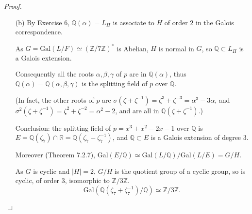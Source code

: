 \documentclass[11pt,a4paper]{article}
\newcommand{\Q}{\mathbb{Q}}
\newcommand{\Z}{\mathbb{Z}}
\newcommand{\Gal}{\mathrm{Gal}}
\begin{document}
\begin{proof}
\begin{enumerate}
$3$ is a generator of the cyclic group $(\Z/7\Z)^*$ ($3^2 = 2,3^3 = -1$), so  $\Gal(L/\Q) = \{e,\sigma, \sigma^2,\sigma^3 ,\sigma^4, \sigma^5\}$, where $\sigma$ is characterized by $\sigma(\zeta) = \zeta^3$ (then $\sigma^k(\zeta) = \zeta^{3^k} = \zeta,\zeta^3,\zeta^2,\zeta^{-1},\zeta^{-3}, \zeta^{-2}$ for $k = 0,1,2,3,4,5$). The {\it distinct} images of $\alpha$ by the automorphisms of $G$ are so $\zeta + \zeta^{-1}, \zeta^2+\zeta^{-2},\zeta^3+\zeta^{-3}$, so the minimal polynomial of $\alpha$ over $\Q$ is (see the proof of Th. 7.1.1)
$$(x-\zeta- \zeta^{-1})(x-\zeta ^{2} - \zeta^{-2})(x-\zeta^3 - \zeta^{-3}).$$
To expand this polynomial, we use the following Sage instructions:
\begin{verbatim}
K.<zeta> = NumberField(1+x+x^2+x^3+x^4+x^5+x^6)
R.<t> = PolynomialRing(QQ)
f = (t-zeta - zeta^(-1))*(t-zeta^2-zeta^(-2))*(t-zeta^3-zeta^(-3));f
\end{verbatim}
$$t^{3} + t^{2} - 2 t - 1$$
which gives the minimal polynomial
\begin{align*}
p &= x^3+x^2 -2x-1\\
&=(x-\zeta- \zeta^{-1})(x-\zeta ^{2} - \zeta^{-2})(x-\zeta^3 - \zeta^{-3})\\
&=(x - 2 \cos(2\pi/7))(x- 2 \cos(4\pi/7))(x-2 \cos(6 \pi/7))
\end{align*}
\item[(b)]
By Exercise 6, $\Q(\alpha) = L_H $ is associate to $H$ of order 2 in the Galois correspondence.

As $G =\Gal(L/F) \simeq (\Z/7\Z)^*$ is Abelian, $H$ is normal in $G$, so $\Q \subset L_H$ is a Galois extension.

Consequently all the roots $\alpha,\beta, \gamma$ of $p$ are in $\Q(\alpha)$, thus $ \mathbb{Q}(\alpha) = \mathbb{Q}(\alpha,\beta,\gamma)$ is the splitting field of $p$ over $\Q$.

(In fact, the other roots of $p$ are $\sigma(\zeta+ \zeta^{-1}) = \zeta^3+\zeta^{-3} = \alpha^3 - 3 \alpha$, and $\sigma^2(\zeta+ \zeta^{-1}) = \zeta^2 + \zeta^{-2}  = \alpha^2 - 2$, and are all in $\Q(\zeta+\zeta^{-1})$.)

Conclusion:  the splitting field of $p=x^3+x^2-2x-1$ over $\Q$ is $E= \mathbb{Q}(\zeta_7) \cap \mathbb{R} = \mathbb{Q}(\zeta_7 + \zeta_7^{-1})$, and $\Q \subset E$ is a Galois extension of degree 3.

Moreover (Theorem 7.2.7), $\Gal(E/\Q) \simeq \Gal(L/\Q)/\Gal(L/E) = G/H$.

As $G$ is cyclic and $\vert H \vert = 2$, $G/H$ is the quotient group of a cyclic group, so is cyclic, of order 3, isomorphic to $\Z/3\Z$.
$$\Gal(\Q(\zeta_7+\zeta_7^{-1})/\Q) \simeq \Z/3\Z.$$
\end{enumerate}
\end{proof}
\end{document}
